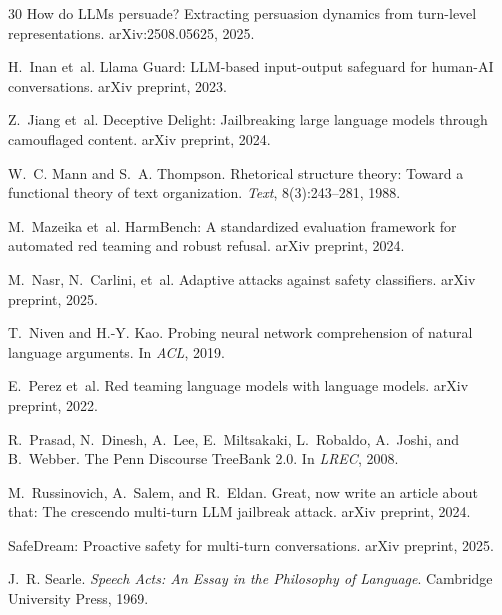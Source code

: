 \documentclass[11pt,a4paper]{article}
\begin{document}
\begin{thebibliography}{30}
How do LLMs persuade? Extracting persuasion dynamics from turn-level representations.
\newblock arXiv:2508.05625, 2025.

H.~Inan et~al.
\newblock Llama Guard: LLM-based input-output safeguard for human-AI conversations.
\newblock arXiv preprint, 2023.

Z.~Jiang et~al.
\newblock Deceptive Delight: Jailbreaking large language models through camouflaged content.
\newblock arXiv preprint, 2024.

W.~C. Mann and S.~A. Thompson.
\newblock Rhetorical structure theory: Toward a functional theory of text organization.
\newblock \emph{Text}, 8(3):243--281, 1988.

M.~Mazeika et~al.
\newblock HarmBench: A standardized evaluation framework for automated red teaming and robust refusal.
\newblock arXiv preprint, 2024.

M.~Nasr, N.~Carlini, et~al.
\newblock Adaptive attacks against safety classifiers.
\newblock arXiv preprint, 2025.

T.~Niven and H.-Y. Kao.
\newblock Probing neural network comprehension of natural language arguments.
\newblock In \emph{ACL}, 2019.

E.~Perez et~al.
\newblock Red teaming language models with language models.
\newblock arXiv preprint, 2022.

R.~Prasad, N.~Dinesh, A.~Lee, E.~Miltsakaki, L.~Robaldo, A.~Joshi, and B.~Webber.
\newblock The Penn Discourse TreeBank 2.0.
\newblock In \emph{LREC}, 2008.

M.~Russinovich, A.~Salem, and R.~Eldan.
\newblock Great, now write an article about that: The crescendo multi-turn LLM jailbreak attack.
\newblock arXiv preprint, 2024.

SafeDream: Proactive safety for multi-turn conversations.
\newblock arXiv preprint, 2025.

J.~R. Searle.
\newblock \emph{Speech Acts: An Essay in the Philosophy of Language}.
\newblock Cambridge University Press, 1969.


\end{thebibliography}
\end{document}
